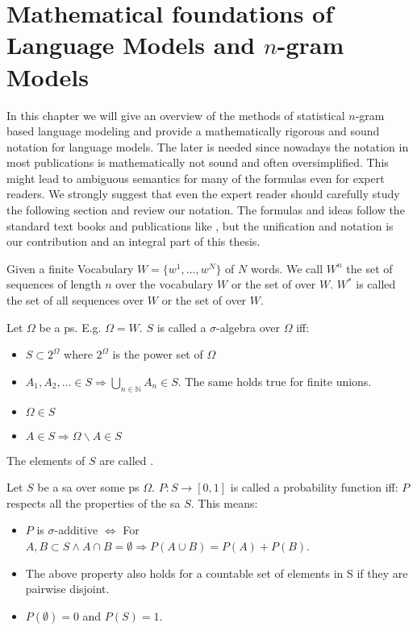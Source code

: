 \documentclass[•]{book}
\begin{document}
\chapter{Mathematical foundations of Language Models and $n$-gram Models}
In this chapter we will give an overview of the methods of statistical $n$-gram based language modeling and provide a mathematically rigorous and sound notation for language models.
The later is needed since nowadays the notation in most publications is mathematically not sound and often oversimplified.
This might lead to ambiguous semantics for many of the formulas even for expert readers. 
We strongly suggest that even the expert reader should carefully study the following section and review our notation. 
The formulas and ideas follow the standard text books and publications like \cite{chen:goodman},  but the unification and notation is our contribution and an integral part of this thesis. 

Given a finite Vocabulary $W = \{w^1,\dots,w^N\}$ of $N$ words. 
We call $W^{n}$ the set of sequences of length $n$ over the vocabulary $W$ or the set of  over $W$.
$W^{*}$ is called the set of all sequences over $W$ or the set of  over $W$.

\begin{definition}\label{def:sa}
Let $\Omega$ be a \gls{ps}. 
E.g. $\Omega=W$.
$S$ is called a $\sigma$-algebra over $\Omega$ iff:

\begin{itemize}
\item $S\subset 2^{\Omega}$ where $2^{\Omega}$ is the power set of $\Omega$  \eqnum
\item $A_1,A_2,\dots \in S \Rightarrow \bigcup_{n\in\mathbb{N}}A_n \in S$. The same holds true for finite unions. 
\item $\Omega \in S$ \eqnum
\item $A\in S \Rightarrow \Omega\backslash A \in S$ \eqnum
\end{itemize}

\end{definition}
The elements of $S$ are called .

\begin{definition}\label{def:pf}
Let $S$ be a \gls{sa} over some \gls{ps} $\Omega$. $P:S\longrightarrow [0,1]$ is called a probability function iff: 
$P$ respects all the properties of the \gls{sa} $S$.
This means: 
\begin{itemize}
\item $P$ is $\sigma$-additive $\Leftrightarrow$ For $A,B \subset S \land A\cap B = \emptyset \Rightarrow P(A\cup B) = P(A)+P(B)$.
\item The above property also holds for a countable set of elements in S if they are pairwise disjoint. 
\item $P(\emptyset)=0$ and $P(S)=1$. 
\end{itemize}
\end{definition}
\end{document}
